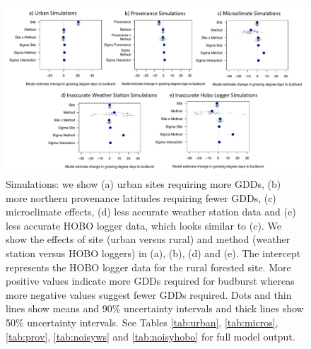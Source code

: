 \documentclass{article}\usepackage[]{graphicx}\usepackage[]{color}
\begin{document}
\begin{figure}[H]
      \centering
      \includegraphics[width=16cm]{..//analyses/figures/muplot_sims.pdf}
\caption{ Simulations: we show (a) urban sites requiring more GDDs, (b) more northern provenance latitudes requiring fewer GDDs, (c) microclimate effects, (d) less accurate weather station data and (e) less accurate HOBO logger data, which looks similar to (c). We show the effects of site (urban versus rural) and method (weather station versus HOBO loggers) in (a), (b), (d) and (e). The intercept represents the HOBO logger data for the rural forested site. More positive values indicate more GDDs required for budburst whereas more negative values suggest fewer GDDs required. Dots and thin lines show means and 90\% uncertainty intervals and thick lines show 50\% uncertainty intervals. See Tables \ref{tab:urban}, \ref{tab:micros}, \ref{tab:prov}, \ref{tab:noisyws} and \ref{tab:noisyhobo} for full model output. } 
\label{fig:musims}
\end{figure}
\end{document}
